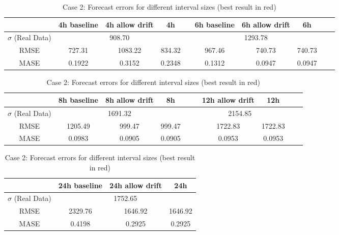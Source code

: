 \begin{table}[h]
\footnotesize
\begin{tabular}{c|ccccccccc}
              & 4h baseline & 4h allow drift & 4h     &  & 6h baseline & 6h allow drift & 6h     &  &  \\ \hline
$\sigma$ (Real Data) & \multicolumn{3}{c}{908.70}           &  & \multicolumn{3}{c}{1293.78}           &  &  \\
RMSE          & 727.31      & 1083.22        & 834.32 &  & 967.46      & 740.73         & 740.73 &  &  \\
MASE          & 0.1922      & 0.3152         & 0.2348 &  & 0.1312      & 0.0947         & 0.0947 &  & 
\end{tabular}

\vspace{0.5cm}

\begin{tabular}{c|ccccccccc}
              & 8h baseline & 8h allow drift & 8h     &  & \color{red}{12h baseline} & 12h
              allow drift & 12h     &  &  \\ \hline
$\sigma$ (Real Data) & \multicolumn{3}{c}{1691.32}           &  & \multicolumn{3}{c}{2154.85}           &  &  \\
RMSE          & 1205.49      & 999.47        & 999.47 &  & \color{red}{1565.43}    & 1722.83        & 1722.83 &  &  \\
MASE          & 0.0983      & 0.0905         & 0.0905 &  & \color{red}{0.0857}     & 0.0953         & 0.0953 &  & 
\end{tabular}

\vspace{0.5cm}

\begin{tabular}{c|ccc}
              & 24h baseline & 24h allow drift & 24h  \\ \hline
$\sigma$ (Real Data) & \multicolumn{3}{c}{1752.65}     \\
RMSE          & 2329.76     & 1646.92         & 1646.92   \\
MASE          & 0.4198      & 0.2925         & 0.2925 \\
\end{tabular}

\vspace{0.5cm}

\caption{Case 2: Forecast errors for different interval sizes (best result in
red)}\label{tab:case2_interval}
\end{table}


